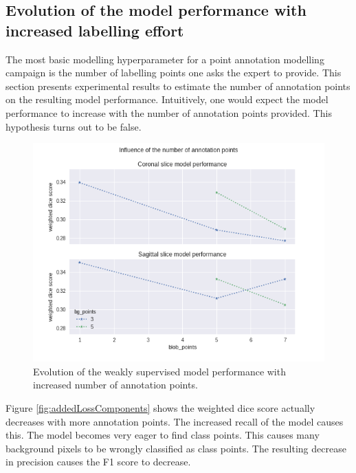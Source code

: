 \subsection{Evolution of the model performance with increased labelling effort}
\par{
    The most basic modelling hyperparameter for a point annotation modelling campaign is the number of labelling points one asks the expert to provide.
    This section presents experimental results to estimate the number of annotation points on the resulting model performance.
    Intuitively, one would expect the model performance to increase with the number of annotation points provided.
    This hypothesis turns out to be false.
}
\begin{figure}
    \centering
    \includegraphics[width=.95\textwidth]{images/BlobPoints_influence.png}
    \caption{Evolution of the weakly supervised model performance with increased number of annotation points.}
\end{figure}
\par{
    Figure \ref{fig:addedLossComponents} shows the weighted dice score actually decreases with more annotation points.
    The increased recall of the model causes this. 
    The model becomes very eager to find class points. This causes many background pixels to be wrongly classified as class points.
    The resulting decrease in precision causes the F1 score to decrease.
}
